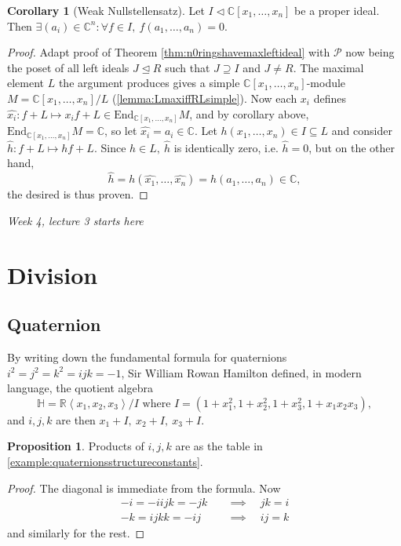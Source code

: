 \documentclass[a4paper]{article}
\newcommand{\la}{\left\langle}
\newcommand{\ra}{\right\rangle}
\newcommand{\R}{\mathbb{R}}
\newcommand{\C}{\mathbb{C}}
\newcommand{\Hq}{\mathbb{H}}
\newcommand{\End}{\text{End}}
\theoremstyle{definition}
\newtheorem{prop}[defn]{Proposition}
\newtheorem{coro}[defn]{Corollary}
\begin{document}
\begin{coro}[Weak Nullstellensatz]
Let $I\lhd \C[x_1,\ldots,x_n]$ be a proper ideal. Then $\exists (a_i)\in\C^n:\forall f\in I,\ f(a_1,\ldots,a_n)=0$.
\end{coro}
\begin{proof}
Adapt proof of Theorem \ref{thm:n0ringshavemaxleftideal} with $\mathcal P$ now being the poset of all left ideals $J\unlhd R$ such that $J\supseteq I$ and $J\neq R$. The maximal element $L$ the argument produces gives a simple $\C[x_1,\ldots,x_n]$-module $M=\C[x_1,\ldots,x_n]/L$ (\ref{lemma:LmaxiffRLsimple}). Now each $x_i$ defines $\widehat{x_i}:f+L\mapsto x_if+L\in \End_{\C[x_1,\ldots,x_n]}M$, and by corollary above, $\End_{\C[x_1,\ldots,x_n]}M=\C$, so let $\widehat{x_i}=a_i\in\C$. Let $h(x_1,\ldots,x_n)\in I\subseteq L$ and consider $\widehat{h}:f+L\mapsto hf+L$. Since $h\in L,\ \widehat h$ is identically zero, i.e. $\widehat h=0$, but on the other hand,
\[
\widehat h=h(\widehat{x_1},\ldots,\widehat{x_n})=h(a_1,\ldots,a_n)\in\C,
\]
the desired is thus proven.
\end{proof}

\begin{flushright}
\textit{Week 4, lecture 3 starts here}
\end{flushright}

\section{Division}
\subsection{Quaternion}
By writing down the fundamental formula for quaternions $i^2=j^2=k^2=ijk=-1$, Sir William Rowan Hamilton defined, in modern language, the quotient algebra
\[
\Hq=\R\la x_1,x_2,x_3\ra/I\text{ where }I=\left(1+x_1^2,1+x_2^2,1+x_3^2,1+x_1x_2x_3\right),
\]
and $i,j,k$ are then $x_1+I,\ x_2+I,\ x_3+I$.

\begin{prop}
Products of $i,j,k$ are as the table in \ref{example:quaternionsstructureconstants}.
\end{prop}
\begin{proof}
The diagonal is immediate from the formula. Now
\[
\begin{aligned}
-i=-iijk=-jk \quad &\implies \quad jk=i\\
-k=ijkk=-ij \quad &\implies \quad ij=k
\end{aligned}
\]
and similarly for the rest.
\end{proof}
\end{document}
